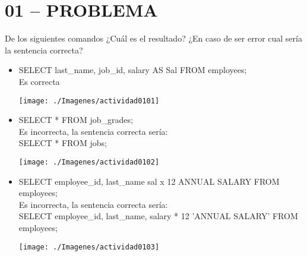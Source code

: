\section{01 – PROBLEMA} 
De los siguientes comandos ¿Cuál es el resultado? ¿En caso de ser error cual sería la sentencia correcta?

\begin{itemize}
	\item SELECT last\_name, job\_id, salary AS Sal FROM employees;
	\\Es correcta
	\begin{center}
	\texttt{[image: ./Imagenes/actividad0101]} 
	\end{center}

	\item SELECT * FROM job\_grades;
	\\Es incorrecta, la sentencia correcta sería:
	\\SELECT * FROM jobs;
	\begin{center}
	\texttt{[image: ./Imagenes/actividad0102]} 
	\end{center}
	
	\item SELECT employee\_id, last\_name sal x 12 ANNUAL SALARY FROM employees;
	\\Es incorrecta, la sentencia correcta sería:
	\\SELECT employee\_id, last\_name, salary * 12 'ANNUAL SALARY' FROM employees;
	\begin{center}
	\texttt{[image: ./Imagenes/actividad0103]} 
	\end{center}

\end{itemize} 

